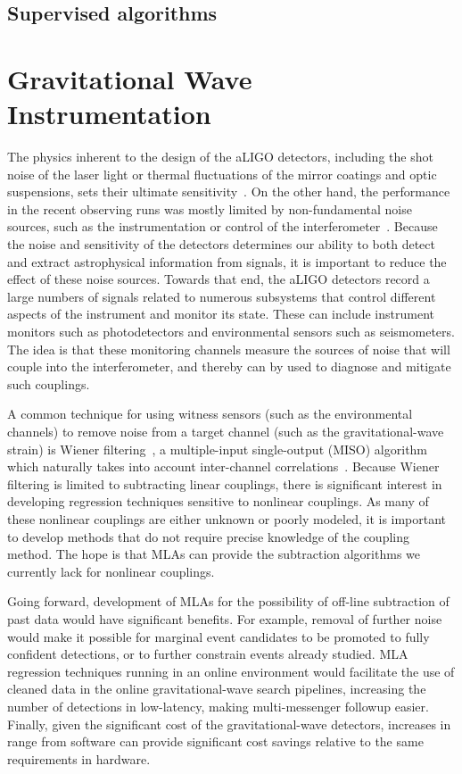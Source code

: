 \documentclass[letterpaper, aps, prd, superscriptaddress, showpacs, nofootinbib]{revtex4}
\begin{document}
\subsection{Supervised algorithms}

\section{Gravitational Wave Instrumentation}
\label{sec:gw_inst}


The physics inherent to the design of the aLIGO detectors, including the shot noise of the laser light or thermal fluctuations of the mirror coatings and optic suspensions, sets their ultimate sensitivity~\citep{aLIGO}. On the other hand, the performance in the recent observing runs was mostly limited by non-fundamental noise sources, such as the instrumentation or control of the interferometer~\citep{AbEA2016g}.
Because the noise and sensitivity of the detectors determines our ability to both detect and extract astrophysical information from signals, it is important to reduce the effect of these noise sources.
Towards that end, the aLIGO detectors record a large numbers of signals related to numerous subsystems that control different aspects of the instrument and monitor its state. These can include instrument monitors such as photodetectors and environmental sensors such as seismometers.
The idea is that these monitoring channels measure the sources of noise that will couple into the interferometer, and thereby can by used to diagnose and mitigate such couplings.

A common technique for using witness sensors (such as the environmental channels) to remove noise from a target channel (such as the gravitational-wave strain) is Wiener filtering~\citep{Vas2001,Say2003}, a multiple-input single-output (MISO) algorithm which naturally takes into account inter-channel correlations~\citep{DeEA2012,CoMu2016}.
Because Wiener filtering is limited to subtracting linear couplings, there is significant interest in developing regression techniques sensitive to nonlinear couplings. 
As many of these nonlinear couplings are either unknown or poorly modeled, it is important to develop methods that do not require precise knowledge of the coupling method.
The hope is that MLAs can provide the subtraction algorithms we currently lack for nonlinear couplings.

Going forward, development of MLAs for the possibility of off-line subtraction of past data would have significant benefits. 
For example, removal of further noise would make it possible for marginal event candidates to be promoted to fully confident detections, or to further constrain events already studied.
MLA regression techniques running in an online environment would facilitate the use of cleaned data in the online gravitational-wave search pipelines, increasing the number of detections in low-latency, making multi-messenger followup easier.
Finally, given the significant cost of the gravitational-wave detectors, increases in range from software can provide significant cost savings relative to the same requirements in hardware.
\end{document}
